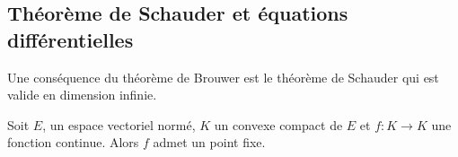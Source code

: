 \subsection{Théorème de Schauder et équations différentielles}

Une conséquence du théorème de Brouwer est le théorème de Schauder qui est valide en dimension infinie.

\begin{theorem}       \label{ThovHJXIU}
    Soit \( E\), un espace vectoriel normé, \( K\) un convexe compact de \( E\) et \( f\colon K\to K\) une fonction continue. Alors \( f\) admet un point fixe.
\end{theorem}

